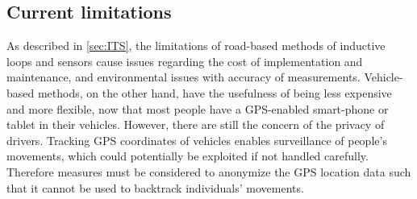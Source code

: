 \subsection{Current limitations}
As described in \ref{sec:ITS}, the limitations of road-based methods of inductive loops and sensors cause issues regarding the cost of implementation and maintenance, and environmental issues with accuracy of measurements. Vehicle-based methods, on the other hand, have the usefulness of being less expensive and more flexible, now that most people have a GPS-enabled smart-phone or tablet in their vehicles.
However, there are still the concern of the privacy of drivers. Tracking GPS coordinates of vehicles enables surveillance of people's movements, which could potentially be exploited if not handled carefully. Therefore measures must be considered to anonymize the GPS location data such that it cannot be used to backtrack individuals' movements.

